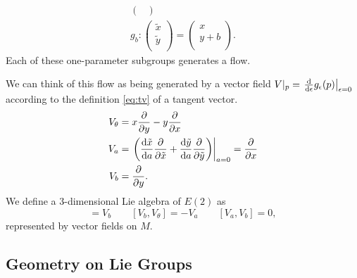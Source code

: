 \begin{example}[]
\begin{gather}
\begin{pmatrix}
    \end{pmatrix} \\
    g_b \colon
    \begin{pmatrix}
    \tilde{x} \\
    \tilde{y} \\
    \end{pmatrix} = 
    \begin{pmatrix}
    x \\
    y + b \\
    \end{pmatrix}.
  \end{gather}
  Each of these one-parameter subgroups generates a flow.
  \begin{figure}[tbhp]
    \centering
    \def\svgwidth{0.4\columnwidth}
    
    \caption{}
    \label{fig:l3f1}
  \end{figure}
  We can think of this flow as being generated by a vector field $V\rvert_{p} = \left.\dv{\epsilon} g_\epsilon(p)\right\rvert_{\epsilon = 0}$ according to the definition \eqref{eq:tv} of a tangent vector.
  \begin{align}
    V_\theta &= x \frac{\partial }{\partial y} - y \frac{\partial }{\partial x} \\
    V_a &= \left. \left( \dv{\tilde{x}}{a} \frac{\partial }{\partial \tilde{x}} + \dv{\tilde{y}}{a} \frac{\partial }{\partial \tilde{y}} \right) \right\rvert_{a = 0} = \frac{\partial }{\partial x} \\
    V_b &= \frac{\partial }{\partial y}.
  \end{align}
  We define a $3$-dimensional Lie algebra of $E(2)$ as
  \begin{equation}
    [V_a, V_\theta] = V_b \qquad [V_b, V_\theta] = -V_a \qquad [V_a, V_b] = 0,
  \end{equation} 
  represented by vector fields on $M$.
\end{example}

\subsection{Geometry on Lie Groups}%
\label{sub:geometry_on_lie_groups}

